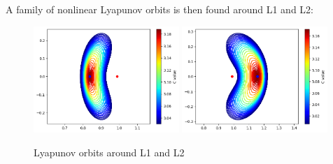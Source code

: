 \documentclass{report}
\begin{document}
A family of nonlinear Lyapunov orbits is then found around L1 and L2:
\begin{figure}[h]
    \centering
    \includegraphics[width=0.49\textwidth]{images/L1.png}
    \includegraphics[width=0.49\textwidth]{images/L2.png}
    \caption{Lyapunov orbits around L1 and L2}
\end{figure}
\end{document}
